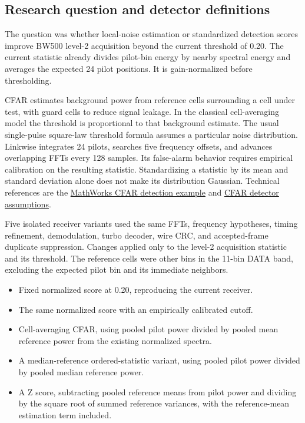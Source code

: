 \documentclass[11pt,a4paper]{article}
\begin{document}
\subsection{Research question and detector definitions}

The question was whether local-noise estimation or standardized detection
scores improve BW500 level-2 acquisition beyond the current threshold
of 0.20. The current statistic already divides pilot-bin energy by
nearby spectral energy and averages the expected 24 pilot positions.
It is gain-normalized before thresholding.

CFAR estimates background power from reference cells surrounding a
cell under test, with guard cells to reduce signal leakage. In the
classical cell-averaging model the threshold is proportional to that
background estimate. The usual single-pulse square-law threshold
formula assumes a particular noise distribution. Linkwise integrates
24 pilots, searches five frequency offsets, and advances overlapping
FFTs every 128 samples. Its false-alarm behavior requires empirical
calibration on the resulting statistic. Standardizing a statistic by
its mean and standard deviation alone does not make its distribution
Gaussian. Technical references are the
\href{https://www.mathworks.com/help/radar/ug/constant-false-alarm-rate-cfar-detection.html}{MathWorks CFAR detection example}
and \href{https://www.mathworks.com/help/phased/ug/constant-false-alarm-rate-cfar-detectors.html}{CFAR detector assumptions}.

Five isolated receiver variants used the same FFTs, frequency hypotheses,
timing refinement, demodulation, turbo decoder, wire CRC, and accepted-frame
duplicate suppression. Changes applied only to the level-2 acquisition
statistic and its threshold. The reference cells were other bins in the
11-bin DATA band, excluding the expected pilot bin and its immediate
neighbors.

\begin{itemize}
\item Fixed normalized score at 0.20, reproducing the current receiver.
\item The same normalized score with an empirically calibrated cutoff.
\item Cell-averaging CFAR, using pooled pilot power divided by pooled
      mean reference power from the existing normalized spectra.
\item A median-reference ordered-statistic variant, using pooled pilot
      power divided by pooled median reference power.
\item A Z score, subtracting pooled reference means from pilot power
      and dividing by the square root of summed reference variances,
      with the reference-mean estimation term included.
\end{itemize}
\end{document}
